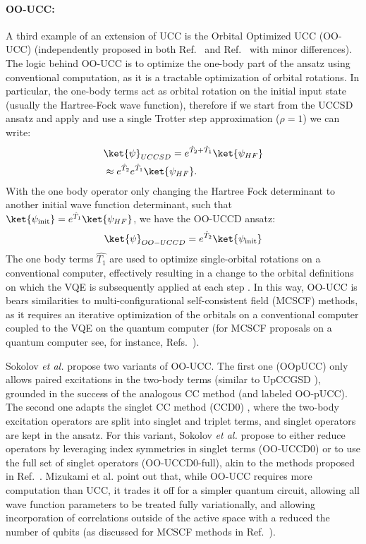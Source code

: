 \paragraph{OO-UCC:} A third example of an extension of UCC is the Orbital Optimized UCC (OO-UCC) (independently proposed in both Ref.~\cite{Mizukami2020} and Ref.~\cite{Sokolov2020} with minor differences). The logic behind OO-UCC is to optimize the one-body part of the ansatz using conventional computation, as it is a tractable optimization of orbital rotations. In particular, the one-body terms act as orbital rotation on the initial input state (usually the Hartree-Fock wave function), therefore if we start from the UCCSD ansatz and apply and use a single Trotter step approximation ($\rho = 1$) we can write:
\begin{align}
&\ket{\psi}_{UCCSD} = e^{\hat{T}_2+ \hat{T}_1}\ket{\psi_{HF}} \nonumber \\
& \approx e^{\hat{T}_2} e^{\hat{T}_1}\ket{\psi_{HF}}.
\end{align}
With the one body operator only changing the Hartree Fock determinant to another initial wave function determinant, such that $\ket{\psi_{\mathrm{init}}} = e^{\hat{T}_1}\ket{\psi_{HF}} $, we have the OO-UCCD ansatz:
\begin{align}
\ket{\psi}_{OO-UCCD} = e^{\hat{T}_2} \ket{\psi_{\mathrm{init}}}
\end{align}
The one body terms $\hat{T_1}$ are used to optimize single-orbital rotations on a conventional computer, effectively resulting in a change to the orbital definitions on which the VQE is subsequently applied at each step \cite{Mizukami2020, Sokolov2020}. In this way, OO-UCC is bears similarities to multi-configurational self-consistent field (MCSCF) methods, as it requires an iterative optimization of the orbitals on a conventional computer coupled to the VQE on the quantum computer (for MCSCF proposals on a quantum computer see, for instance, Refs.~\cite{Yalouz2021, Tilly2021}). 

Sokolov \textit{et al.} \cite{Sokolov2020} propose two variants of OO-UCC. The first one (OOpUCC) only allows paired excitations in the two-body terms (similar to UpCCGSD \cite{Lee2019}), grounded in the success of the analogous CC method \cite{Bozkaya2011,Bozkaya2013, Stein2014} (and labeled OO-pUCC). The second one adapts the singlet CC method (CCD0) \cite{Bulik2015}, where the two-body excitation operators are split into singlet and triplet terms, and singlet operators are kept in the ansatz. For this variant, Sokolov \textit{et al.} \cite{Sokolov2020} propose to either reduce operators by leveraging index symmetries in singlet terms (OO-UCCD0) or to use the full set of singlet operators (OO-UCCD0-full), akin to the methods proposed in Ref.~\cite{Bulik2015}. Mizukami et al. \cite{Mizukami2020} point out that, while OO-UCC requires more computation than UCC, it trades it off for a simpler quantum circuit, allowing all wave function parameters to be treated fully variationally, and allowing incorporation of correlations outside of the active space with a reduced the number of qubits (as discussed for MCSCF methods in Ref.~\cite{Yalouz2021, Tilly2021}). \\

